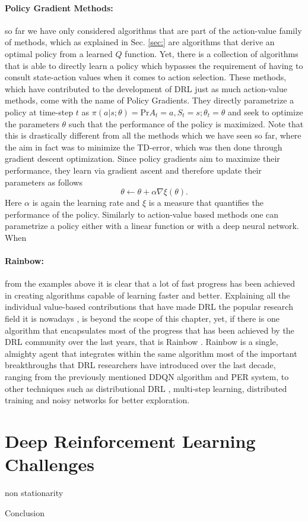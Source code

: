\paragraph{Policy Gradient Methods:} so far we have only considered algorithms that are part of the action-value family of methods, which as explained in Sec. \ref{sec:} are algorithms that derive an optimal policy from a learned $Q$ function. Yet, there is a collection of algorithms that is able to directly learn a policy which bypasses the requirement of having to consult state-action values when it comes to action selection. These methods, which have contributed to the development of DRL just as much action-value methods, come with the name of Policy Gradients. They directly parametrize a policy at time-step $t$ as $\pi(a|s;\theta)=\text{Pr}{A_t = a, S_t=s};\theta_t=\theta$ and seek to optimize the parameters $\theta$ such that the performance of the policy is maximized. Note that this is drastically different from all the methods which we have seen so far, where the aim in fact was to minimize the TD-error, which was then done through gradient descent optimization. Since policy gradients aim to maximize their performance, they learn via gradient ascent and therefore update their parameters as follows
\begin{equation}
	\theta \leftarrow \theta + \alpha \nabla \xi(\theta).
\end{equation}
Here $\alpha$ is again the learning rate and $\xi$ is a measure that quantifies the performance of the policy. Similarly to action-value based methods one can parametrize a policy either with a linear function or with a deep neural network. When 


\paragraph{Rainbow:} from the examples above it is clear that a lot of fast progress has been achieved in creating algorithms capable of learning faster and better. Explaining all the individual value-based contributions that have made DRL the popular research field it is nowadays \cite{henderson2018deep}, is beyond the scope of this chapter, yet, if there is one algorithm that encapsulates most of the progress that has been achieved by the DRL community over the last years, that is Rainbow \cite{hessel2018rainbow}. Rainbow is a single, almighty agent that integrates within the same algorithm most of the important breakthroughs that DRL researchers have introduced over the last decade, ranging from the previously mentioned DDQN algorithm and PER system, to other techniques such as distributional DRL \cite{bellemare2017distributional}, multi-step learning, distributed training \cite{mnih2016asynchronous} and noisy networks \cite{fortunato2017noisy} for better exploration.


\section{Deep Reinforcement Learning Challenges}
non stationarity


\begin{remark}{Conclusion}

\end{remark}



